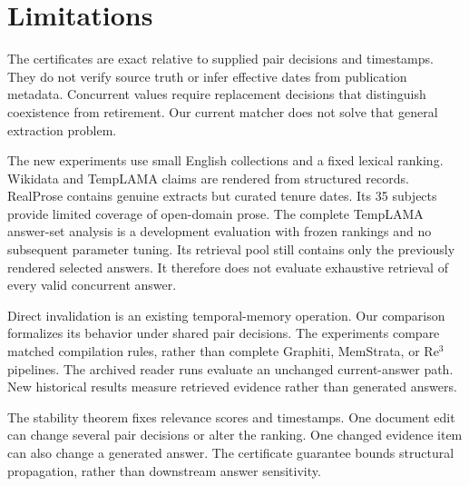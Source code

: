 \section*{Limitations}

The certificates are exact relative to supplied pair decisions and timestamps.
They do not verify source truth or infer effective dates from publication metadata.
Concurrent values require replacement decisions that distinguish coexistence from retirement.
Our current matcher does not solve that general extraction problem.

The new experiments use small English collections and a fixed lexical ranking.
Wikidata and TempLAMA claims are rendered from structured records.
RealProse contains genuine extracts but curated tenure dates.
Its 35 subjects provide limited coverage of open-domain prose.
The complete TempLAMA answer-set analysis is a development evaluation with frozen rankings and no subsequent parameter tuning.
Its retrieval pool still contains only the previously rendered selected answers.
It therefore does not evaluate exhaustive retrieval of every valid concurrent answer.

Direct invalidation is an existing temporal-memory operation.
Our comparison formalizes its behavior under shared pair decisions.
The experiments compare matched compilation rules, rather than complete Graphiti, MemStrata, or Re$^3$ pipelines.
The archived reader runs evaluate an unchanged current-answer path.
New historical results measure retrieved evidence rather than generated answers.

The stability theorem fixes relevance scores and timestamps.
One document edit can change several pair decisions or alter the ranking.
One changed evidence item can also change a generated answer.
The certificate guarantee bounds structural propagation, rather than downstream answer sensitivity.
